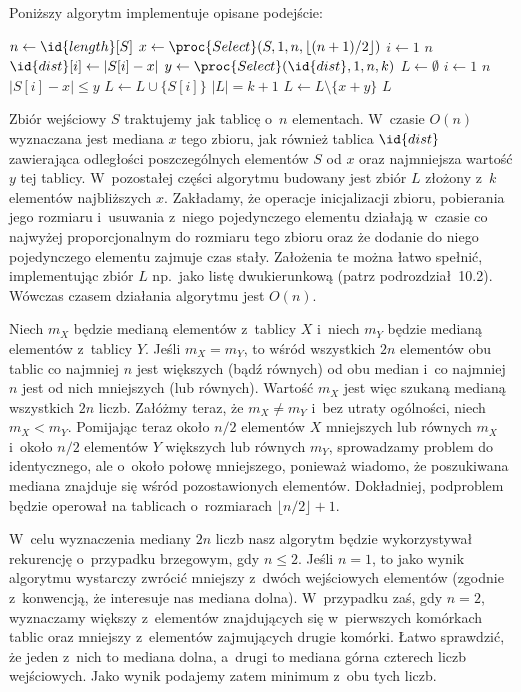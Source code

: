 Poniższy algorytm implementuje opisane podejście:
\begin{codebox}
\li	$n\gets\id{length}[S]$
\li	$x\gets\proc{Select}(S,1,n,\lfloor(n+1)/2\rfloor)$
\li	\For $i\gets1$ \To $n$
\li		\Do $\id{dist}[i]\gets|S[i]-x|$
		\End
\li	$y\gets\proc{Select}(\id{dist},1,n,k)$
\li	$L\gets\emptyset$
\li	\For $i\gets1$ \To $n$
\li		\Do
			\If $|S[i]-x|\le y$
\li				\Then $L\gets L\cup\{S[i]\}$
				\End
		\End
\li	\If $|L|=k+1$
\li		\Then $L\gets L\setminus\{x+y\}$
		\End
\li	\Return $L$
\end{codebox}
Zbiór wejściowy $S$ traktujemy jak tablicę o~$n$ elementach. W~czasie $O(n)$ wyznaczana jest mediana $x$ tego zbioru, jak również tablica $\id{dist}$ zawierająca odległości poszczególnych elementów $S$ od $x$ oraz  najmniejsza wartość $y$ tej tablicy. W~pozostałej części algorytmu budowany jest zbiór $L$ złożony z~$k$ elementów najbliższych $x$. Zakładamy, że operacje inicjalizacji zbioru, pobierania jego rozmiaru i~usuwania z~niego pojedynczego elementu działają w~czasie co najwyżej proporcjonalnym do rozmiaru tego zbioru oraz że dodanie do niego pojedynczego elementu zajmuje czas stały. Założenia te można łatwo spełnić, implementując zbiór $L$ np.\ jako listę dwukierunkową (patrz podrozdział~10.2). Wówczas czasem działania algorytmu jest $O(n)$.

\exercise %
Niech $m_X$ będzie medianą elementów z~tablicy $X$ i~niech $m_Y$ będzie medianą elementów z~tablicy $Y$. Jeśli $m_X=m_Y$, to wśród wszystkich $2n$ elementów obu tablic co najmniej $n$ jest większych (bądź równych) od obu median i~co najmniej $n$ jest od nich mniejszych (lub równych). Wartość $m_X$ jest więc szukaną medianą wszystkich $2n$ liczb. Załóżmy teraz, że $m_X\ne m_Y$ i~bez utraty ogólności, niech $m_X<m_Y$. Pomijając teraz około $n/2$ elementów $X$ mniejszych lub równych $m_X$ i~około $n/2$ elementów $Y$ większych lub równych $m_Y$, sprowadzamy problem do identycznego, ale o~około połowę mniejszego, ponieważ wiadomo, że poszukiwana mediana znajduje się wśród pozostawionych elementów. Dokładniej, podproblem będzie operował na tablicach o~rozmiarach $\lfloor n/2\rfloor+1$.

W~celu wyznaczenia mediany $2n$ liczb nasz algorytm będzie wykorzystywał rekurencję o~przypadku brzegowym, gdy $n\le2$. Jeśli $n=1$, to jako wynik algorytmu wystarczy zwrócić mniejszy z~dwóch wejściowych elementów (zgodnie z~konwencją, że interesuje nas mediana dolna). W~przypadku zaś, gdy $n=2$, wyznaczamy większy z~elementów znajdujących się w~pierwszych komórkach tablic oraz mniejszy z~elementów zajmujących drugie komórki. Łatwo sprawdzić, że jeden z~nich to mediana dolna, a~drugi to mediana górna czterech liczb wejściowych. Jako wynik podajemy zatem minimum z~obu tych liczb.

